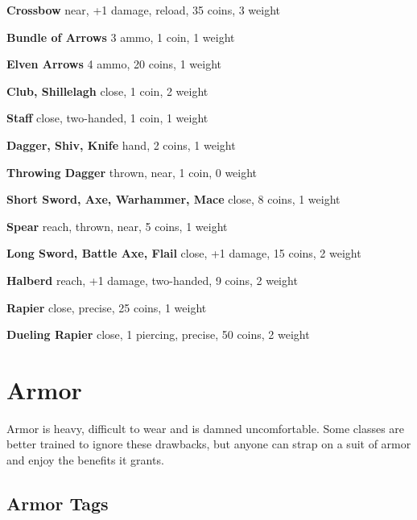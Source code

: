 {\noindent \bfseries Crossbow} \hspace*{\fill} near, +1 damage, reload, 35 coins, 3 weight

{\noindent \bfseries Bundle of Arrows} \hspace*{\fill} 3 ammo, 1 coin, 1 weight

{\noindent \bfseries Elven Arrows} \hspace*{\fill} 4 ammo, 20 coins, 1 weight

{\noindent \bfseries Club, Shillelagh} \hspace*{\fill} close, 1 coin, 2 weight

{\noindent \bfseries Staff} \hspace*{\fill} close, two-handed, 1 coin, 1 weight

{\noindent \bfseries Dagger, Shiv, Knife} \hspace*{\fill} hand, 2 coins, 1 weight

{\noindent \bfseries Throwing Dagger} \hspace*{\fill} thrown, near, 1 coin, 0 weight

{\noindent \bfseries Short Sword, Axe, Warhammer, Mace} \hspace*{\fill} close, 8 coins, 1 weight

{\noindent \bfseries Spear} \hspace*{\fill} reach, thrown, near, 5 coins, 1 weight

{\noindent \bfseries Long Sword, Battle Axe, Flail} \hspace*{\fill} close, +1 damage, 15 coins, 2 weight

{\noindent \bfseries Halberd} \hspace*{\fill} reach, +1 damage, two-handed, 9 coins, 2 weight

{\noindent \bfseries Rapier} \hspace*{\fill} close, precise, 25 coins, 1 weight

{\noindent \bfseries Dueling Rapier} \hspace*{\fill} close, 1 piercing, precise, 50 coins, 2 weight
\section*{Armor}

Armor is heavy, difficult to wear and is damned uncomfortable. Some classes are better trained to ignore these drawbacks, but anyone can strap on a suit of armor and enjoy the benefits it grants.
\subsection{Armor Tags}

